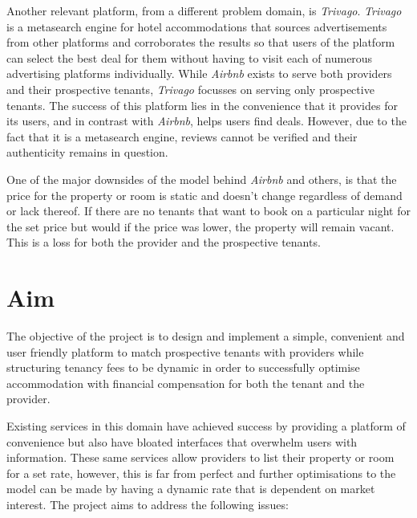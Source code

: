 \documentclass[12pt,a4paper]{article}
\begin{document}
Another relevant platform, from a different problem domain, is \emph{Trivago}. \emph{Trivago} is a metasearch engine for hotel accommodations that sources advertisements from other platforms and corroborates the results so that users of the platform can select the best deal for them without having to visit each of numerous advertising platforms individually. While \emph{Airbnb} exists to serve both providers and their prospective tenants, \emph{Trivago} focusses on serving only prospective tenants. The success of this platform lies in the convenience that it provides for its users, and in contrast with \emph{Airbnb}, helps users find deals. However, due to the fact that it is a metasearch engine, reviews cannot be verified and their authenticity remains in question.

One of the major downsides of the model behind \emph{Airbnb} and others, is that the price for the property or room is static and doesn’t change regardless of demand or lack thereof. If there are no tenants that want to book on a particular night for the set price but would if the price was lower, the property will remain vacant. This is a loss for both the provider and the prospective tenants.

\section*{Aim}
The objective of the project is to design and implement a simple, convenient and user friendly platform to match prospective tenants with providers while structuring tenancy fees to be dynamic in order to successfully optimise accommodation with financial compensation for both the tenant and the provider.

Existing services in this domain have achieved success by providing a platform of convenience but also have bloated interfaces that overwhelm users with information. These same services allow providers to list their property or room for a set rate, however, this is far from perfect and further optimisations to the model can be made by having a dynamic rate that is dependent on market interest. The project aims to address the following issues:
\end{document}
